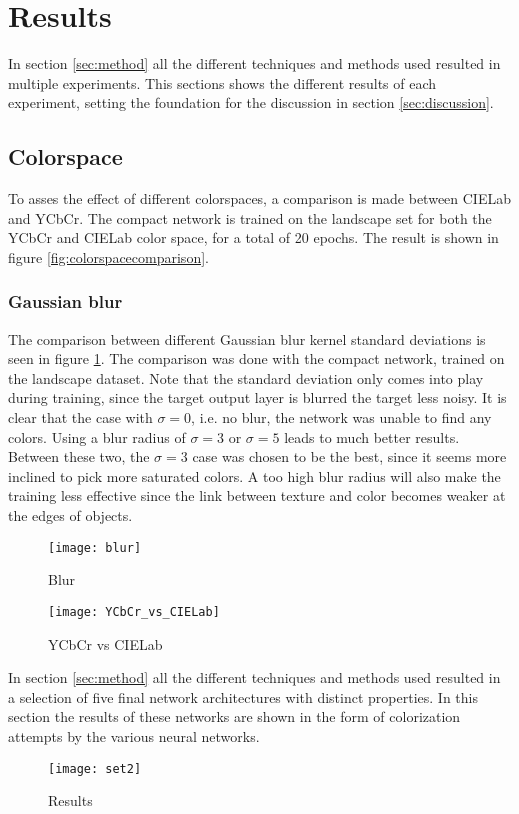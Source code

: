 \section{Results}\label{sec:results}

In section \ref{sec:method} all the different techniques and methods used resulted in multiple experiments. This sections shows the different results of each experiment, setting the foundation for the discussion in section \ref{sec:discussion}.

\subsection{Colorspace}
To asses the effect of different colorspaces, a comparison is made between CIELab and YCbCr. The compact network is trained on the landscape set for both the YCbCr and CIELab color space, for a total of 20 epochs. The result is shown in figure \ref{fig:colorspacecomparison}.

\subsubsection{Gaussian blur}
The comparison between different Gaussian blur kernel standard deviations is seen in figure \ref{fig:blur}. The comparison was done with the compact network, trained on the landscape dataset. Note that the standard deviation only comes into play during training, since the target output layer is blurred the target less noisy. It is clear that the case with $\sigma=0$, i.e. no blur, the network was unable to find any colors. Using a blur radius of $\sigma=3$ or $\sigma=5$ leads to much better results. Between these two, the $\sigma=3$ case was chosen to be the best, since it seems more inclined to pick more saturated colors. A too high blur radius will also make the training less effective since the link between texture and color becomes weaker at the edges of objects.

\begin{figure}[h]
	\centering
	\texttt{[image: blur]}
	\caption{Blur}
	\label{fig:blur}
\end{figure}

\begin{figure}[h]
	\centering
	\texttt{[image: YCbCr\_vs\_CIELab]}
	\caption{YCbCr vs CIELab}
	\label{fig:YCbCr_vs_CIELab}
\end{figure}

In section \ref{sec:method} all the different techniques and methods used resulted in a selection of five final network architectures with distinct properties. In this section the results of these networks are shown in the form of colorization attempts by the various neural networks.

\begin{figure}[h]
	\centering
	\texttt{[image: set2]}
	\caption{Results}
	\label{fig:results}
\end{figure}


